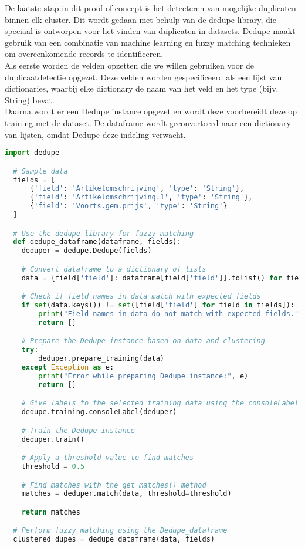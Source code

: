 De laatste stap in dit proof-of-concept is het detecteren van mogelijke duplicaten binnen elk cluster. Dit wordt gedaan met behulp van de dedupe library, die speciaal is ontworpen voor het vinden van duplicaten in datasets. Dedupe maakt gebruik van een combinatie van machine learning en fuzzy matching technieken om overeenkomende records te identificeren.
\\Als eerste worden de velden opzetten die we willen gebruiken voor de duplicaatdetectie opgezet. Deze velden worden gespecificeerd als een lijst van dictionaries, waarbij elke dictionary de naam van het veld en het type (bijv. String) bevat.
\\Daarna wordt er een Dedupe instance opgezet en wordt deze voorbereidt deze op training met de dataset. De dataframe wordt geconverteerd naar een dictionary van lijsten, omdat Dedupe deze indeling verwacht.
\begin{lstlisting}[language=Python, caption={Opzetten van een Dedupe instance en trainen van deze instance met de data}]
  import dedupe

  # Sample data
  fields = [
      {'field': 'Artikelomschrijving', 'type': 'String'},
      {'field': 'Artikelomschrijving.1', 'type': 'String'},
      {'field': 'Voorts.gem.prijs', 'type': 'String'}
  ]

  # Use the dedupe library for fuzzy matching
  def dedupe_dataframe(dataframe, fields):
    deduper = dedupe.Dedupe(fields)

    # Convert dataframe to a dictionary of lists
    data = {field['field']: dataframe[field['field']].tolist() for field in fields}

    # Check if field names in data match with expected fields
    if set(data.keys()) != set([field['field'] for field in fields]):
        print("Field names in data do not match with expected fields.")
        return []

    # Prepare the Dedupe instance based on data and clustering
    try:
        deduper.prepare_training(data)
    except Exception as e:
        print("Error while preparing Dedupe instance:", e)
        return []

    # Give labels to the selected training data using the consoleLabel method
    dedupe.training.consoleLabel(deduper)

    # Train the Dedupe instance
    deduper.train()

    # Apply a threshold value to find matches
    threshold = 0.5

    # Find matches with the get_matches() method
    matches = deduper.match(data, threshold=threshold)

    return matches

  # Perform fuzzy matching using the Dedupe_dataframe
  clustered_dupes = dedupe_dataframe(data, fields)
\end{lstlisting}


